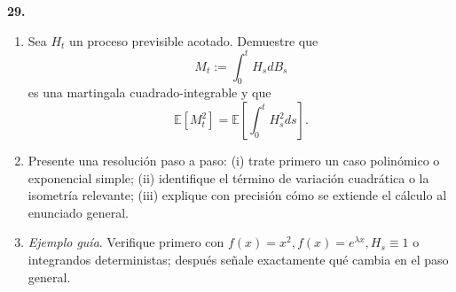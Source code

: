 \documentclass[11pt, letterpaper]{article}
\begin{document}
\newpage

\begin{ejercicio}
    \textbf{29.} 
    \begin{enumerate}
        \item Sea $H_t$ un proceso previsible acotado. Demuestre que
        \[ M_t := \int_0^t H_s dB_s \]
        es una martingala cuadrado-integrable y que
        \[ \mathbb{E}[M_t^2] = \mathbb{E}\left[ \int_0^t H_s^2 ds \right]. \]
        \item Presente una resolución paso a paso: (i) trate primero un caso polinómico o exponencial simple; (ii) identifique el término de variación cuadrática o la isometría relevante; (iii) explique con precisión cómo se extiende el cálculo al enunciado general.
        \item \textit{Ejemplo guía}. Verifique primero con $f(x) = x^2, f(x) = e^{\lambda x}, H_s \equiv 1$ o integrandos deterministas; después señale exactamente qué cambia en el paso general.
    \end{enumerate}
\end{ejercicio}

\vspace{5mm}
\end{document}
